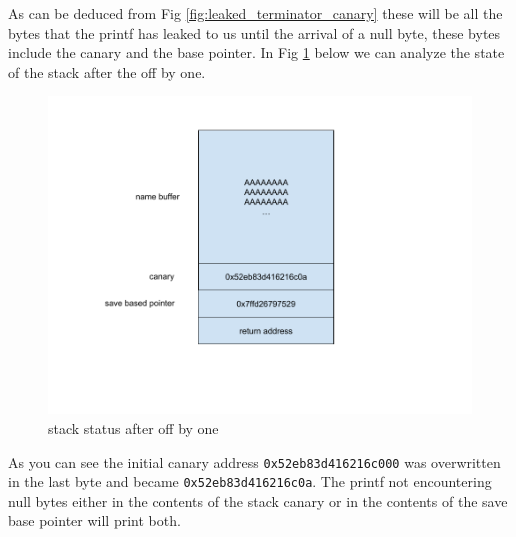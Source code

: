     As can be deduced from Fig \ref{fig:leaked_terminator_canary} these will be all the bytes that the printf has leaked to us until the arrival of a null byte, these bytes include the canary and the base pointer.\newline
    \clearpage
    In Fig \ref{fig:stack terminator} below we can analyze the state of the stack after the off by one.\newline
    \begin{figure}[htbp]
        \centering
        \includegraphics[width=1\linewidth]{Images/draw_terminator_stack_canaryleak.png}
        \caption{stack status after off by one}
        \label{fig:stack terminator}
    \end{figure}
    
    As you can see the initial canary address \texttt{0x52eb83d416216c000}
    was overwritten in the last byte and became \texttt{0x52eb83d416216c0a}.\newline
    The printf not encountering null bytes either in the contents of the stack canary or in the contents of the save base pointer will print both.\newline
